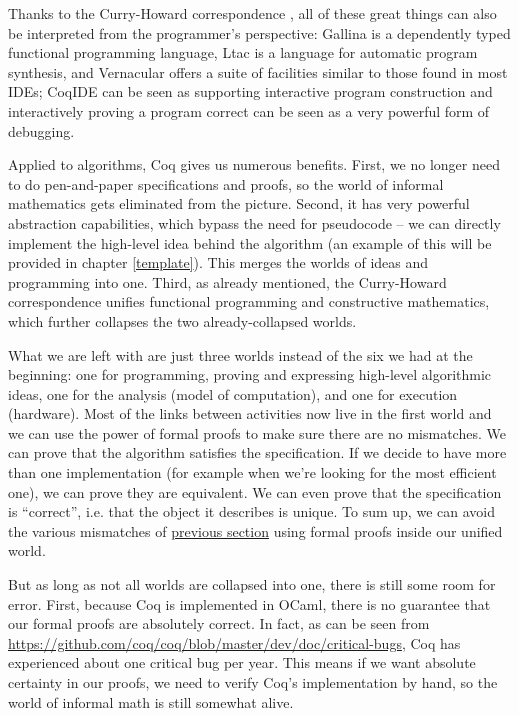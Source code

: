 \documentclass[declaration,mgr,english,shortabstract]{iithesis}
\begin{document}
Thanks to the Curry-Howard correspondence \cite{CurryHoward}, all of these great things can also be interpreted from the programmer's perspective: Gallina is a dependently typed functional programming language, Ltac is a language for automatic program synthesis, and Vernacular offers a suite of facilities similar to those found in most IDEs; CoqIDE can be seen as supporting interactive program construction and interactively proving a program correct can be seen as a very powerful form of debugging.

Applied to algorithms, Coq gives us numerous benefits. First, we no longer need to do pen-and-paper specifications and proofs, so the world of informal mathematics gets eliminated from the picture. Second, it has very powerful abstraction capabilities, which bypass the need for pseudocode -- we can directly implement the high-level idea behind the algorithm (an example of this will be provided in chapter \ref{template}). This merges the worlds of ideas and programming into one. Third, as already mentioned, the Curry-Howard correspondence unifies functional programming and constructive mathematics, which further collapses the two already-collapsed worlds.

What we are left with are just three worlds instead of the six we had at the beginning: one for programming, proving and expressing high-level algorithmic ideas, one for the analysis (model of computation), and one for execution (hardware). Most of the links between activities now live in the first world and we can use the power of formal proofs to make sure there are no mismatches. We can prove that the algorithm satisfies the specification. If we decide to have more than one implementation (for example when we're looking for the most efficient one), we can prove they are equivalent. We can even prove that the specification is ``correct'', i.e. that the object it describes is unique. To sum up, we can avoid the various mismatches of \hyperref[worlds]{previous section} using formal proofs inside our unified world.

But as long as not all worlds are collapsed into one, there is still some room for error. First, because Coq is implemented in OCaml, there is no guarantee that our formal proofs are absolutely correct. In fact, as can be seen from \url{https://github.com/coq/coq/blob/master/dev/doc/critical-bugs}, Coq has experienced about one critical bug per year. This means if we want absolute certainty in our proofs, we need to verify Coq's implementation by hand, so the world of informal math is still somewhat alive.
\end{document}
